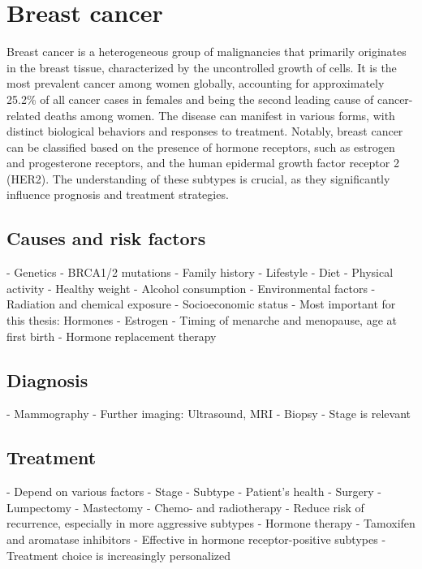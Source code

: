 \section{Breast cancer}
Breast cancer is a heterogeneous group of malignancies that primarily originates
in the breast tissue, characterized by the uncontrolled growth of cells. It is
the most prevalent cancer among women globally, accounting for approximately
25.2\% of all cancer cases in females and being the second leading cause of
cancer-related deaths among women\supercite{pace_breast_2016}. The disease can
manifest in various forms, with distinct biological behaviors and responses to
treatment. Notably, breast cancer can be classified based on the presence of
hormone receptors, such as estrogen and progesterone receptors, and the human
epidermal growth factor receptor 2 (HER2)\supercite{eccles_critical_2013}. The
understanding of these subtypes is crucial, as they significantly influence
prognosis and treatment strategies.

\subsection{Causes and risk factors}

- Genetics
    - BRCA1/2 mutations
    - Family history
- Lifestyle
    - Diet
    - Physical activity
    - Healthy weight
    - Alcohol consumption
- Environmental factors
    - Radiation and chemical exposure
    - Socioeconomic status
- Most important for this thesis: Hormones
    - Estrogen
    - Timing of menarche and menopause, age at first birth
    - Hormone replacement therapy

\subsection{Diagnosis}

- Mammography
- Further imaging: Ultrasound, MRI
- Biopsy
- Stage is relevant

\subsection{Treatment}

- Depend on various factors
    - Stage
    - Subtype
    - Patient's health
- Surgery
    - Lumpectomy
    - Mastectomy
- Chemo- and radiotherapy
    - Reduce risk of recurrence, especially in more aggressive subtypes
- Hormone therapy
    - Tamoxifen and aromatase inhibitors
    - Effective in hormone receptor-positive subtypes
- Treatment choice is increasingly personalized
